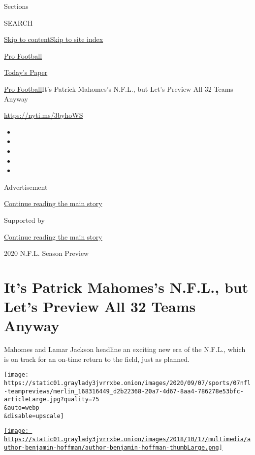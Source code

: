 Sections

SEARCH

\protect\hyperlink{site-content}{Skip to
content}\protect\hyperlink{site-index}{Skip to site index}

\href{https://www.nytimes3xbfgragh.onion/section/sports/football}{Pro
Football}

\href{https://myaccount.nytimes3xbfgragh.onion/auth/login?response_type=cookie\&client_id=vi}{}

\href{https://www.nytimes3xbfgragh.onion/section/todayspaper}{Today's
Paper}

\href{/section/sports/football}{Pro Football}\textbar{}It's Patrick
Mahomes's N.F.L., but Let's Preview All 32 Teams Anyway

\url{https://nyti.ms/3byhoWS}

\begin{itemize}
\item
\item
\item
\item
\item
\end{itemize}

Advertisement

\protect\hyperlink{after-top}{Continue reading the main story}

Supported by

\protect\hyperlink{after-sponsor}{Continue reading the main story}

2020 N.F.L. Season Preview

\hypertarget{its-patrick-mahomess-nfl-but-lets-preview-all-32-teams-anyway}{%
\section{It's Patrick Mahomes's N.F.L., but Let's Preview All 32 Teams
Anyway}\label{its-patrick-mahomess-nfl-but-lets-preview-all-32-teams-anyway}}

Mahomes and Lamar Jackson headline an exciting new era of the N.F.L.,
which is on track for an on-time return to the field, just as planned.

\texttt{[image: https://static01.graylady3jvrrxbe.onion/images/2020/09/07/sports/07nfl-teampreviews/merlin\_168316449\_d2b22368-20a7-4d67-8aa4-786278e53bfc-articleLarge.jpg?quality=75\\\&auto=webp\\\&disable=upscale]}

\href{https://www.nytimes3xbfgragh.onion/by/benjamin-hoffman}{\texttt{[image: https://static01.graylady3jvrrxbe.onion/images/2018/10/17/multimedia/author-benjamin-hoffman/author-benjamin-hoffman-thumbLarge.png]}}

